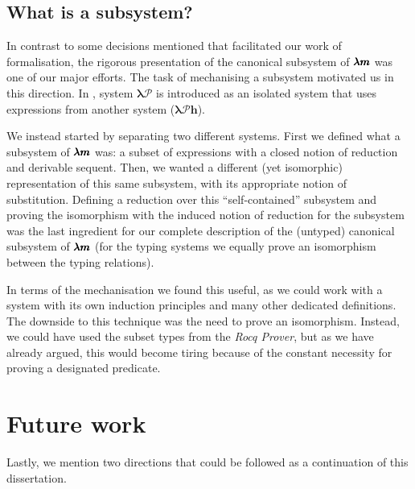 \subsection{What is a subsystem?}
In contrast to some decisions mentioned that facilitated our work of formalisation, the rigorous presentation of the canonical subsystem of $\pmb{\lambda m}$ was one of our major efforts.
The task of mechanising a subsystem motivated us in this direction.
In \cite[Chapter~3]{JCES2002}, system $\pmb{\lambda \mathcal{P}}$ is introduced as an isolated system that uses expressions from another system ($\pmb{\lambda \mathcal{P} h}$).

We instead started by separating two different systems.
First we defined what a subsystem of $\pmb{\lambda m}$ was: a subset of expressions with a closed notion of reduction and derivable sequent.
Then, we wanted a different (yet isomorphic) representation of this same subsystem, with its appropriate notion of substitution.
Defining a reduction over this ``self-contained'' subsystem and proving the isomorphism with the induced notion of reduction for the subsystem was the last ingredient for our complete description of the (untyped) canonical subsystem of $\pmb{\lambda m}$ (for the typing systems we equally prove an isomorphism between the typing relations).

In terms of the mechanisation we found this useful, as we could work with a system with its own induction principles and many other dedicated definitions.
The downside to this technique was the need to prove an isomorphism.
Instead, we could have used the subset types from the \textit{Rocq Prover}, but as we have already argued, this would become tiring because of the constant necessity for proving a designated predicate.

\begin{comment}
In the mechanisation work found in \cite{AndrewAdams}, similar metatheory to ours is mechanised.
\end{comment}

\section{Future work}

Lastly, we mention two directions that could be followed as a continuation of this dissertation.


